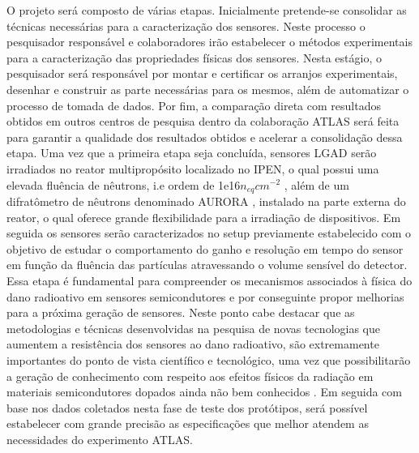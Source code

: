 O projeto será composto de várias etapas. Inicialmente pretende-se consolidar as técnicas necessárias para a caracterização dos sensores. Neste processo o pesquisador responsável e colaboradores irão estabelecer o métodos experimentais para a caracterização das propriedades físicas dos sensores. Nesta estágio, o pesquisador será responsável por montar e certificar os arranjos experimentais, desenhar e construir as parte necessárias para os mesmos, além de automatizar o processo de tomada de dados. Por fim, a comparação direta com resultados obtidos em outros centros de pesquisa dentro da colaboração ATLAS será feita para garantir a qualidade dos resultados obtidos e acelerar a consolidação dessa etapa.  
Uma vez que a primeira etapa seja concluída, sensores LGAD serão irradiados no reator multipropósito localizado no IPEN, o qual possui uma elevada fluência de nêutrons, i.e ordem de 1e16$n_{eq}cm{^{-2}}$ \cite{IPEN_REATOR}, além de um difratômetro de nêutrons denominado AURORA \cite{IPEN_AURORA}, instalado na parte externa do reator, o qual oferece grande flexibilidade para a irradiação de dispositivos. Em seguida os sensores serão caracterizados no setup previamente estabelecido com o objetivo de estudar o comportamento do ganho e resolução em tempo do sensor em função da fluência das partículas atravessando o volume sensível do detector. Essa etapa é fundamental para compreender os mecanismos associados à física do dano radioativo em sensores semicondutores e por conseguinte propor melhorias para a próxima geração de sensores. 
Neste ponto cabe destacar que as metodologias e técnicas desenvolvidas na pesquisa de novas tecnologias que aumentem a resistência dos sensores ao dano radioativo, são extremamente importantes do ponto de vista científico e tecnológico, uma vez que possibilitarão a geração de conhecimento com respeito aos efeitos físicos da radiação em materiais semicondutores dopados ainda não bem conhecidos \cite{tdr,JIN_LGAD,NIMA_LGAD}. %
Em seguida com base nos dados coletados nesta fase de teste dos protótipos, será possível estabelecer com grande precisão as especificações que melhor atendem as necessidades do experimento ATLAS. 


